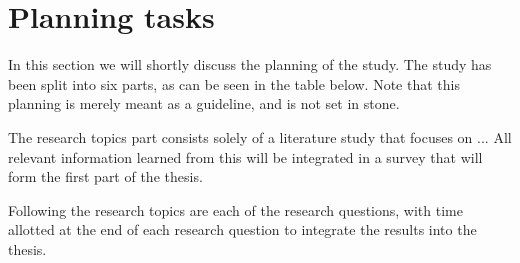 \section{Planning tasks}

In this section we will shortly discuss the planning of the study. The study has been split into six parts, as can be seen in the table below. Note that this planning is merely meant as a guideline, and is not set in stone.


\noindent{}


The research topics part consists solely of a literature study that focuses on ... All relevant information learned from this will be integrated in a survey that will form the first part of the thesis.

Following the research topics are each of the research questions, with time allotted at the end of each research question to integrate the results into the thesis. 